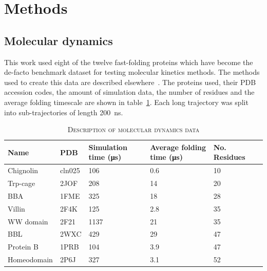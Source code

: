 \documentclass[journal=jacsat,manuscript=article]{achemso}
\begin{document}
\section{Methods}
\subsection{Molecular dynamics}

This work used eight of the twelve fast-folding proteins which have become the de-facto benchmark dataset for testing molecular kinetics methods. The methods used to create this data are described elsewhere~\cite{lindorff-larsen_how_2011}. The proteins used, their PDB accession codes, the amount of simulation data, the number of residues and the average folding timescale are shown in table~\ref{tab:data_description}. Each long trajectory was split into sub-trajectories of length \SI{200}{\nano\second}. 

\begin{table}
    \caption{\textsc{Description of molecular dynamics data}}
    \begin{tabularx}{\textwidth}{llXXXX}
    \toprule
    Name & PDB & Simulation time (\si{\micro\second}) & Average folding time (\si{\micro\second}) & No. Residues & \\
    \midrule
    Chignolin           & cln025    & \num{106}     & \num{0.6} & 10 & \\
    Trp-cage            & 2JOF      & \num{208}     & \num{14}  & 20 & \\
    BBA                 & 1FME      & \num{325}     & \num{18}  & 28 & \\
    Villin              & 2F4K      & \num{125}     & \num{2.8} & 35  &\\
    WW domain           & 2F21      & \num{1137}    & \num{21}  & 35 & \\
    BBL                 & 2WXC      & \num{429}     & \num{29}  & 47  &\\
    Protein B           & 1PRB      & \num{104}     & \num{3.9} & 47 & \\
    Homeodomain         & 2P6J      & \num{327}     & \num{3.1} & 52 & \\
    \bottomrule
    \end{tabularx}
    \label{tab:data_description}
\end{table}
\end{document}
